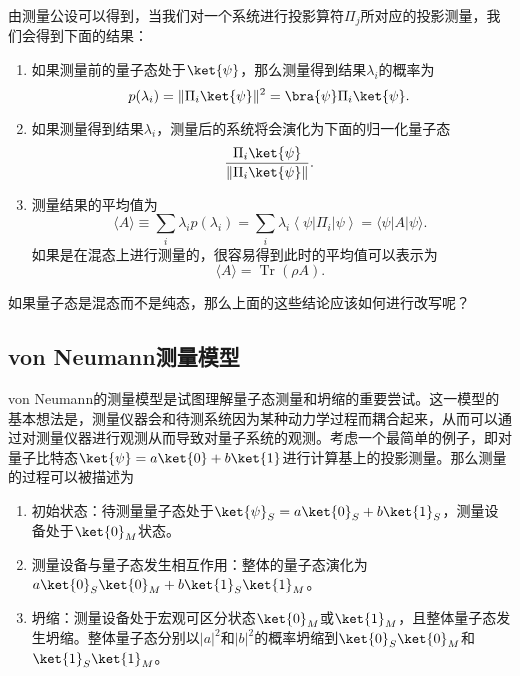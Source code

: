 由测量公设可以得到，当我们对一个系统进行投影算符$\Pi_j$所对应的投影测量，我们会得到下面的结果：
\begin{enumerate}
\item 如果测量前的量子态处于$\ket{\psi}$，那么测量得到结果$\lambda_i$的概率为\begin{equation}
p(\lambda_i)=\Vert \Pi_i\ket{\psi}\Vert^2=\bra{\psi}\Pi_i\ket{\psi}.~
\end{equation}
\item 如果测量得到结果$\lambda_i$，测量后的系统将会演化为下面的归一化量子态
\begin{equation}
\frac{\Pi_i\ket{\psi}}{\Vert\Pi_i\ket{\psi}\Vert}.~
\end{equation}
\item 测量结果的平均值为\begin{equation}
\langle A\rangle \equiv \sum_i \lambda_i p\left(\lambda_i\right)=\sum_i \lambda_i\left\langle\psi\left|\Pi_i\right| \psi\right\rangle=\langle\psi|A| \psi\rangle.~
\end{equation}
如果是在混态上进行测量的，很容易得到此时的平均值可以表示为
\begin{equation}
\langle A\rangle=\operatorname{Tr}(\rho A).~
\end{equation}

\end{enumerate}

\begin{exercise}{}
如果量子态是混态而不是纯态，那么上面的这些结论应该如何进行改写呢？
\end{exercise}

\subsection{von Neumann测量模型}

von Neumann的测量模型是试图理解量子态测量和坍缩的重要尝试。这一模型的基本想法是，测量仪器会和待测系统因为某种动力学过程而耦合起来，从而可以通过对测量仪器进行观测从而导致对量子系统的观测。考虑一个最简单的例子，即对量子比特态$\ket{\psi}=a\ket{0}+b\ket{1}$进行计算基上的投影测量。那么测量的过程可以被描述为
\begin{enumerate}
\item 初始状态：待测量量子态处于$\ket{\psi}_S=a\ket{0}_S+b\ket{1}_S$，测量设备处于$\ket{0}_M$状态。
\item 测量设备与量子态发生相互作用：整体的量子态演化为$a\ket{0}_S\ket{0}_M+b\ket{1}_S\ket{1}_M$。
\item 坍缩：测量设备处于宏观可区分状态$\ket{0}_M$或$\ket{1}_M$，且整体量子态发生坍缩。整体量子态分别以$|a|^2$和$|b|^2$的概率坍缩到$\ket{0}_S\ket{0}_M$和$\ket{1}_S\ket{1}_M$。
\end{enumerate}

